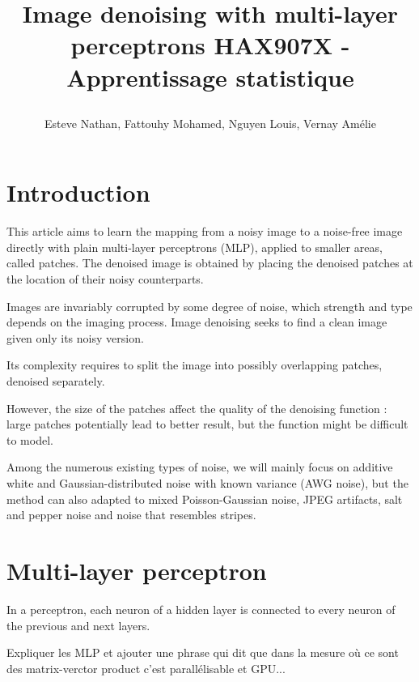 \documentclass[10pt,a4paper]{article}
\author{Esteve Nathan, Fattouhy Mohamed, Nguyen Louis, Vernay Amélie}
\title{%
    \begin{minipage}\linewidth
        \centering
        Image denoising with multi-layer perceptrons
        \vskip3pt
        \large 
        HAX907X - Apprentissage statistique
    \end{minipage}
}
\newcommand{\svs}{\vspace{9pt}}
\begin{document}
\maketitle

\section{Introduction}

This article \cite{denoise} aims to learn the mapping from a noisy image to a noise-free image directly with plain multi-layer perceptrons (MLP), applied to smaller areas, called patches. The denoised image is obtained by placing the denoised patches at the location of their noisy counterparts.

\svs

Images are invariably corrupted by some degree of noise, which strength and type depends on the imaging process. Image denoising seeks to find a clean image given only its noisy version.

\svs

Its complexity requires to split the image into possibly overlapping patches, denoised separately.

\svs

However, the size of the patches affect the quality of the denoising function : large patches potentially lead to better result, but the function might be difficult to model.

\svs

Among the numerous existing types of noise, we will mainly focus on additive white and Gaussian-distributed noise with known variance (AWG noise), but the method can also adapted to mixed Poisson-Gaussian noise, JPEG artifacts, salt and pepper noise and noise that resembles stripes.


\section{Multi-layer perceptron}

In a perceptron, each neuron of a hidden layer is connected to every neuron of the previous and next layers.

\svs

Expliquer les MLP et ajouter une phrase qui dit que dans la mesure où ce sont des matrix-verctor product c'est parallélisable et GPU...

\end{document}
